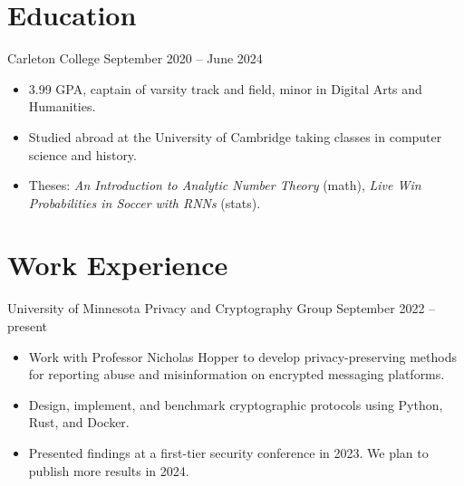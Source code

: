 \documentclass{resume}
\author{Alistair Pattison}
\begin{document}
\maketitle

\section{Education}

{Carleton College}
{September 2020 -- June 2024}

\begin{itemize}
	\item 3.99 GPA, captain of varsity track and field, minor in Digital Arts and Humanities.
	\item Studied abroad at the University of Cambridge taking classes in computer science and history.
	\item Theses:
	      \textit{An Introduction to Analytic Number Theory} (math),
	      \textit{Live Win Probabilities in Soccer with RNNs} (stats).
\end{itemize}

%

\section{Work Experience}

{University of Minnesota Privacy and Cryptography Group}
{September 2022 -- present}

\begin{itemize}
	\item Work with Professor Nicholas Hopper to develop privacy-preserving methods for reporting abuse and misinformation on encrypted messaging platforms.
	\item Design, implement, and benchmark cryptographic protocols using Python, Rust, and Docker.
	\item Presented findings at a first-tier security conference in 2023. We plan to publish more results in 2024.
\end{itemize}
\end{document}
